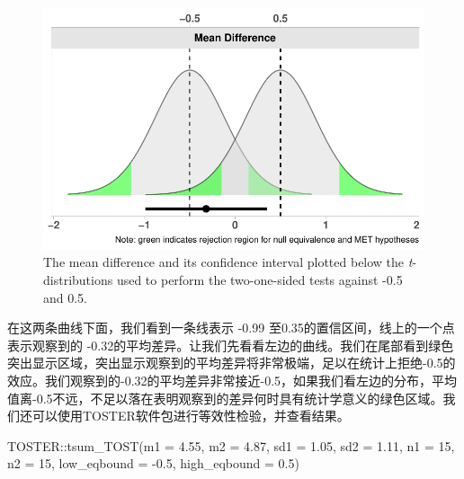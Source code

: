 \documentclass[
  letterpaper,
  DIV=11,
  numbers=noendperiod]{scrreprt}
\newenvironment{Shaded}{\begin{snugshade}}{\end{snugshade}}
\newcommand{\AttributeTok}[1]{\textcolor[rgb]{0.40,0.45,0.13}{#1}}
\newcommand{\DecValTok}[1]{\textcolor[rgb]{0.68,0.00,0.00}{#1}}
\newcommand{\FloatTok}[1]{\textcolor[rgb]{0.68,0.00,0.00}{#1}}
\newcommand{\FunctionTok}[1]{\textcolor[rgb]{0.28,0.35,0.67}{#1}}
\newcommand{\NormalTok}[1]{\textcolor[rgb]{0.00,0.23,0.31}{#1}}
\newcommand{\SpecialCharTok}[1]{\textcolor[rgb]{0.37,0.37,0.37}{#1}}
\begin{document}
\begin{figure}

{\centering \includegraphics[width=1\textwidth,height=\textheight]{09-equivalencetest_files/figure-pdf/fig-tdistequivalence-1.pdf}

}

\caption{\label{fig-tdistequivalence}The mean difference and its
confidence interval plotted below the \emph{t}-distributions used to
perform the two-one-sided tests against -0.5 and 0.5.}

\end{figure}

在这两条曲线下面，我们看到一条线表示 -0.99
至0.35的置信区间，线上的一个点表示观察到的
-0.32的平均差异。让我们先看看左边的曲线。我们在尾部看到绿色突出显示区域，突出显示观察到的平均差异将非常极端，足以在统计上拒绝-0.5的效应。我们观察到的-0.32的平均差异非常接近-0.5，如果我们看左边的分布，平均值离-0.5不远，不足以落在表明观察到的差异何时具有统计学意义的绿色区域。我们还可以使用TOSTER软件包进行等效性检验，并查看结果。

\begin{Shaded}
\begin{Highlighting}[]
\NormalTok{TOSTER}\SpecialCharTok{::}\FunctionTok{tsum\_TOST}\NormalTok{(}\AttributeTok{m1 =} \FloatTok{4.55}\NormalTok{, }
                  \AttributeTok{m2 =} \FloatTok{4.87}\NormalTok{, }
                  \AttributeTok{sd1 =} \FloatTok{1.05}\NormalTok{, }
                  \AttributeTok{sd2 =} \FloatTok{1.11}\NormalTok{,}
                  \AttributeTok{n1 =} \DecValTok{15}\NormalTok{, }
                  \AttributeTok{n2 =} \DecValTok{15}\NormalTok{, }
                  \AttributeTok{low\_eqbound =} \SpecialCharTok{{-}}\FloatTok{0.5}\NormalTok{, }
                  \AttributeTok{high\_eqbound =} \FloatTok{0.5}\NormalTok{)}
\end{Highlighting}
\end{Shaded}
\end{document}
